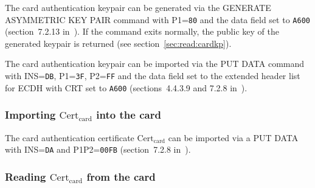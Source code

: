 \documentclass[dvipdfmx,11pt,a4paper,english,final]{article}
\newcommand{\cardcert}[0]{\ensuremath{\mathrm{Cert}_\mathrm{card}}\xspace}
\newcommand{\code}[1]{\texttt{#1}\xspace}
\begin{document}
The card authentication keypair can be generated via the GENERATE
ASYMMETRIC KEY PAIR command with P1=\code{80} and the data field set
to \code{A600} (section~7.2.13 in~\cite{openpgp-card}). If the command
exits normally, the public key of the generated keypair is returned
(see section~\ref{sec:read:cardkp}).

The card authentication keypair can be
imported via the PUT DATA command with INS=\code{DB}, P1=\code{3F},
P2=\code{FF} and the data field set to the extended header list for
ECDH with CRT set to \code{A600} (sections~4.4.3.9 and 7.2.8
in~\cite{openpgp-card}).

\subsubsection{Importing \cardcert into the card}



The card authentication certificate \cardcert can be imported via a
PUT DATA with INS=\code{DA} and P1P2=\code{00FB} (section~7.2.8
in~\cite{openpgp-card}).


\subsubsection{Reading \cardcert from the card}

\end{document}
